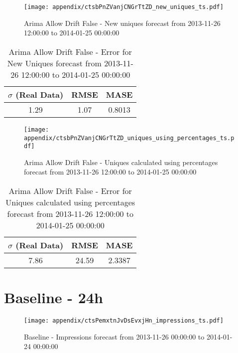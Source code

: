 \begin{figure}[H] \begin{center} \leavevmode
\texttt{[image: appendix/ctsbPnZVanjCNGrTtZD\_new\_uniques\_ts.pdf]} \caption{
Arima Allow Drift False - New uniques forecast from 2013-11-26 12:00:00 to 2014-01-25 00:00:00} \label{fig:appendix/ctsbPnZVanjCNGrTtZD_new_uniques_ts.pdf} \end{center}
\end{figure}

\begin{table}[H]
\centering
\footnotesize
\begin{tabular}{ccc}
$\sigma$ (Real Data) & RMSE & MASE   \\ \hline
1.29 & 1.07 & 0.8013 \\
\end{tabular}

\vspace{0.5cm}

\caption{
Arima Allow Drift False - Error for New Uniques forecast from 2013-11-26 12:00:00 to 2014-01-25 00:00:00}
\end{table}

\begin{figure}[H] \begin{center} \leavevmode
\texttt{[image: appendix/ctsbPnZVanjCNGrTtZD\_uniques\_using\_percentages\_ts.pdf]} \caption{
Arima Allow Drift False - Uniques calculated using percentages forecast from 2013-11-26 12:00:00 to 2014-01-25 00:00:00} \label{fig:appendix/ctsbPnZVanjCNGrTtZD_uniques_using_percentages_ts.pdf} \end{center}
\end{figure}

\begin{table}[H]
\centering
\footnotesize
\begin{tabular}{ccc}
$\sigma$ (Real Data) & RMSE & MASE   \\ \hline
7.86 & 24.59 & 2.3387 \\
\end{tabular}

\vspace{0.5cm}

\caption{
Arima Allow Drift False - Error for Uniques calculated using percentages forecast from 2013-11-26 12:00:00 to 2014-01-25 00:00:00}
\end{table}

\section{Baseline - 24h}
\begin{figure}[H] \begin{center} \leavevmode
\texttt{[image: appendix/ctsPemxtnJvDsEvxjHn\_impressions\_ts.pdf]} \caption{
Baseline - Impressions forecast from 2013-11-26 00:00:00 to 2014-01-24 00:00:00} \label{fig:appendix/ctsPemxtnJvDsEvxjHn_impressions_ts.pdf} \end{center}
\end{figure}

